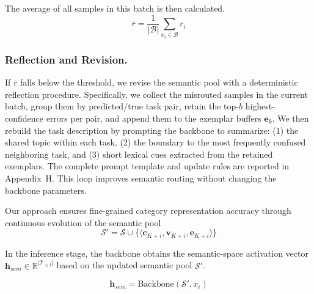 \documentclass[11pt]{article}
\begin{document}
The average of all samples in this batch is then calculated.
\begin{equation}
    \bar{r} = \frac{1}{|\mathcal{B}|} \sum_{x_i \in \mathcal{B}} r_i
\end{equation}

\subsubsection{Reflection and Revision.}

If $\bar{r}$ falls below the threshold, we revise the semantic pool with a deterministic reflection procedure. Specifically, we collect the misrouted samples in the current batch, group them by predicted/true task pair, retain the top-$b$ highest-confidence errors per pair, and append them to the exemplar buffers $\mathbf{e}_k$. We then rebuild the task description by prompting the backbone to summarize: (1) the shared topic within each task, (2) the boundary to the most frequently confused neighboring task, and (3) short lexical cues extracted from the retained exemplars. The complete prompt template and update rules are reported in Appendix~H. This loop improves semantic routing without changing the backbone parameters.



Our approach ensures fine-grained category representation accuracy through continuous evolution of the semantic pool
\begin{equation}
    \mathcal{S}' = \mathcal{S} \cup \{ \langle\mathbf{c}_{K+i}, \mathbf{v}_{K+i}, \mathbf{e}_{K+i} \rangle \}
\end{equation}


In the inference stage, the backbone obtains the semantic-space activation vector $\mathbf{h}_{sem} \in \mathbb{R}^{|\mathcal{T}_{\le t}|}$ based on the updated semantic pool $\mathcal{S}'$.

\begin{equation}
    \mathbf{h}_{sem} = \text{Backbone}(\mathcal{S}', x_i)
\end{equation}
\end{document}
